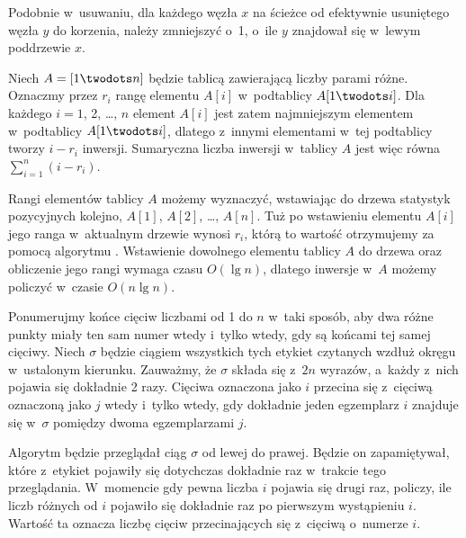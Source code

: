 Podobnie w~usuwaniu, dla każdego węzła $x$ na ścieżce od efektywnie usuniętego węzła $y$ do korzenia,  należy zmniejszyć o~1, o~ile $y$ znajdował się w~lewym poddrzewie $x$.

\exercise %
Niech $A=[1\twodots n]$ będzie tablicą zawierającą liczby parami różne.
Oznaczmy przez $r_i$ rangę elementu $A[i]$ w~podtablicy $A[1\twodots i]$.
Dla każdego $i=1$, 2, \dots, $n$ element $A[i]$ jest zatem  najmniejszym elementem w~podtablicy $A[1\twodots i]$, dlatego z~innymi elementami w~tej podtablicy tworzy $i-r_i$ inwersji.
Sumaryczna liczba inwersji w~tablicy $A$ jest więc równa $\sum_{i=1}^n(i-r_i)$.

Rangi elementów tablicy $A$ możemy wyznaczyć, wstawiając do drzewa statystyk pozycyjnych kolejno, $A[1]$, $A[2]$, \dots, $A[n]$.
Tuż po wstawieniu elementu $A[i]$ jego ranga w~aktualnym drzewie wynosi $r_i$, którą to wartość otrzymujemy za pomocą algorytmu .
Wstawienie dowolnego elementu tablicy $A$ do drzewa oraz obliczenie jego rangi wymaga czasu $O(\lg n)$, dlatego inwersje w~$A$ możemy policzyć w~czasie $O(n\lg n)$.

\exercise %
Ponumerujmy końce cięciw liczbami od 1 do $n$ w~taki sposób, aby dwa różne punkty miały ten sam numer wtedy i~tylko wtedy, gdy są końcami tej samej cięciwy.
Niech $\sigma$ będzie ciągiem wszystkich tych etykiet czytanych wzdłuż okręgu w~ustalonym kierunku.
Zauważmy, że $\sigma$ składa się z~$2n$ wyrazów, a~każdy z~nich pojawia się dokładnie 2 razy.
Cięciwa oznaczona jako $i$ przecina się z~cięciwą oznaczoną jako $j$ wtedy i~tylko wtedy, gdy dokładnie jeden egzemplarz $i$ znajduje się w~$\sigma$ pomiędzy dwoma egzemplarzami $j$.

Algorytm będzie przeglądał ciąg $\sigma$ od lewej do prawej.
Będzie on zapamiętywał, które z~etykiet pojawiły się dotychczas dokładnie raz w~trakcie tego przeglądania.
W~momencie gdy pewna liczba $i$ pojawia się drugi raz, policzy, ile liczb różnych od $i$ pojawiło się dokładnie raz po pierwszym wystąpieniu $i$.
Wartość ta oznacza liczbę cięciw przecinających się z~cięciwą o~numerze $i$.


